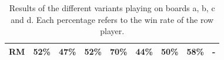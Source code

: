 \documentclass{article}
\begin{document}
\begin{table}[t]
\begin{tabular}{|c||c|c|c|c|c|c|c|c|}
        RM & 52\% & 47\% & 52\% & 70\% & 44\% & 50\% & 58\% &    - \\ \hline 
\end{tabular}
\caption{Results of the different variants playing on boards a, b, c and d. 
Each percentage refers to the win rate of the row player. \label{table:round_robin}}
\end{table}
\end{document}
